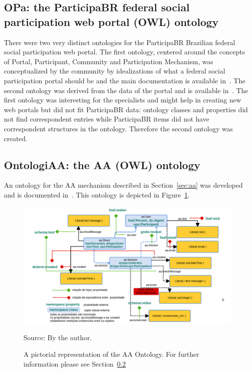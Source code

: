 \begin{apendicesenv}
\subsection{OPa: the ParticipaBR federal social participation web portal (OWL) ontology}\label{sec:opa}
There were two very distinct ontologies for the ParticipaBR Brazilian federal social participation web portal.
The first ontology, centered around the concepts of Portal, Participant, Community and Participation Mechanism,
was conceptualized by the community by idealizations of what a
federal social participation portal should be and the main documentation is available in~\cite{opa0}.
The second ontology was derived from the data of the portal and is available in~\cite{opa}.
The first ontology was interesting for the specialists and might help in creating new web portals but did not fit
ParticipaBR data: ontology classes and properties did not find correspondent entries while
ParticipaBR items did not have correspondent structures in the ontology.
Therefore the second ontology was created.

\subsection{OntologiAA: the AA (OWL) ontology}\label{sec:ontologiaa}
An ontology for the AA mechanism described in Section~\ref{sec:aa} was developed and is documented in~\cite{opa}.
This ontology is depicted in Figure~\ref{fig:aaOn}.
\begin{figure}[h!]
\begin{center}
\includegraphics[scale=.3]{figs/ontologiaa}
\caption{A pictorial representation of the AA Ontology.
	For further information please see Section~\ref{sec:ontologiaa}}
\label{fig:aaOn}
\begin{flushleft}\footnotesize
Source: By the author.\
\end{flushleft}
\end{center}
\end{figure}


\end{apendicesenv}
